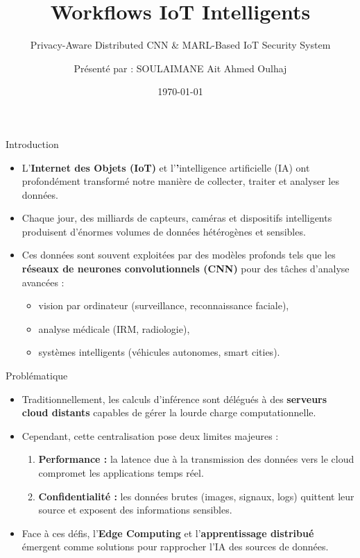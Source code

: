 \documentclass{beamer}
\title{\textbf{Workflows IoT Intelligents}}
\subtitle{Privacy-Aware Distributed CNN \& MARL-Based IoT Security System}
\author{Présenté par : SOULAIMANE Ait Ahmed Oulhaj}
\institute{Master AIDC — FST Béni Mellal}
\date{\today}
\begin{document}
\begin{frame}
  \titlepage
\end{frame}

\begin{frame}{Introduction}
\begin{itemize}
    \item L’\textbf{Internet des Objets (IoT)} et l’\textbf’intelligence artificielle (IA) ont profondément transformé notre manière de collecter, traiter et analyser les données.
    \item Chaque jour, des milliards de capteurs, caméras et dispositifs intelligents produisent d’énormes volumes de données hétérogènes et sensibles.
    \item Ces données sont souvent exploitées par des modèles profonds tels que les \textbf{réseaux de neurones convolutionnels (CNN)} pour des tâches d’analyse avancées :
    \begin{itemize}
        \item vision par ordinateur (surveillance, reconnaissance faciale),
        \item analyse médicale (IRM, radiologie),
        \item systèmes intelligents (véhicules autonomes, smart cities).
    \end{itemize}
\end{itemize}
\end{frame}

\begin{frame}{Problématique}
\begin{itemize}
    \item Traditionnellement, les calculs d’inférence sont délégués à des \textbf{serveurs cloud distants} capables de gérer la lourde charge computationnelle.
    \item Cependant, cette centralisation pose deux limites majeures :
    \begin{enumerate}
        \item \textbf{Performance :} la latence due à la transmission des données vers le cloud compromet les applications temps réel.
        \item \textbf{Confidentialité :} les données brutes (images, signaux, logs) quittent leur source et exposent des informations sensibles.
    \end{enumerate}
    \item Face à ces défis, l’\textbf{Edge Computing} et l’\textbf{apprentissage distribué} émergent comme solutions pour rapprocher l’IA des sources de données.
\end{itemize}
\end{frame}
\end{document}
